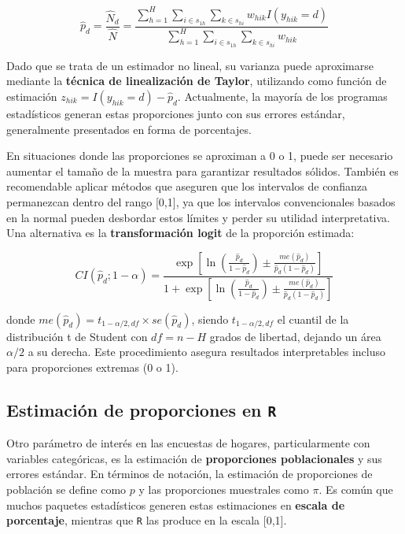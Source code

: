\documentclass[
  spanish,
  12pt,
]{book}
\begin{document}
\[\hat{p}_d = \frac{\hat{N}_d}{\hat{N}} = \frac{\displaystyle\sum_{h=1}^{H} \sum_{i \in s_{1h}} \sum_{k \in s_{hi}} w_{hik} I(y_{hik}=d)} {\displaystyle\sum_{h=1}^{H} \sum_{i \in s_{1h}} \sum_{k \in s_{hi}} w_{hik}}\]

Dado que se trata de un estimador no lineal, su varianza puede aproximarse mediante la \textbf{técnica de linealización de Taylor}, utilizando como función de estimación \(z_{hik}=I(y_{hik}=d)-\hat{p}_d\). Actualmente, la mayoría de los programas estadísticos generan estas proporciones junto con sus errores estándar, generalmente presentados en forma de porcentajes.

En situaciones donde las proporciones se aproximan a 0 o 1, puede ser necesario aumentar el tamaño de la muestra para garantizar resultados sólidos. También es recomendable aplicar métodos que aseguren que los intervalos de confianza permanezcan dentro del rango {[}0,1{]}, ya que los intervalos convencionales basados en la normal pueden desbordar estos límites y perder su utilidad interpretativa. Una alternativa es la \textbf{transformación logit} de la proporción estimada:

\[CI(\hat{p}_d; 1-\alpha) = \frac{\exp \left[\ln\left(\frac{\hat{p}_d}{1-\hat{p}_d}\right) \pm \frac{me(\hat{p}_d)}{\hat{p}_d(1-\hat{p}_d)}\right]}{1 + \exp \left[\ln\left(\frac{\hat{p}_d}{1-\hat{p}_d}\right) \pm \frac{me(\hat{p}_d)}{\hat{p}_d(1-\hat{p}_d)}\right]}\]

donde \(me(\hat{p}_d) = t_{1-\alpha/2, df} \times se(\hat{p}_d)\), siendo \(t_{1-\alpha/2, df}\) el cuantil de la distribución t de Student con \(df = n - H\) grados de libertad, dejando un área \(\alpha/2\) a su derecha. Este procedimiento asegura resultados interpretables incluso para proporciones extremas (0 o 1).

\subsection{\texorpdfstring{Estimación de proporciones en \texttt{R}}{Estimación de proporciones en R}}\label{estimaciuxf3n-de-proporciones-en-r}

Otro parámetro de interés en las encuestas de hogares, particularmente con variables categóricas, es la estimación de \textbf{proporciones poblacionales} y sus errores estándar. En términos de notación, la estimación de proporciones de población se define como \(p\) y las proporciones muestrales como \(\pi\). Es común que muchos paquetes estadísticos generen estas estimaciones en \textbf{escala de porcentaje}, mientras que \texttt{R} las produce en la escala {[}0,1{]}.
\end{document}
